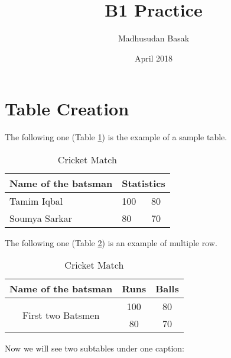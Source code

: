 \documentclass{article}
\title{B1 Practice}
\author{Madhusudan Basak}
\date{April 2018}
\begin{document}
\maketitle

\section{Table Creation}
The following one (Table \ref{tab:1}) is the example of a sample table.
\begin{table}[h!]
\centering
    \begin{tabular}{||m{2cm}| m{2cm}| m{2cm}||}
    \hline
    Name of the batsman & \multicolumn{2}{c|}{Statistics} \\
    \hline
    \hline
    Tamim Iqbal & 100 & 80 \\
    \hline
    Soumya Sarkar & 80 & 70 \\
    \hline
    \end{tabular}
    \caption{Cricket Match}
    \label{tab:1}
\end{table}


The following one (Table \ref{tab:2}) is an example of multiple row.

\begin{table}[h!]
\centering
    \begin{tabular}{|c|c|c|}
    \hline
    Name of the batsman & Runs & Balls \\
    \hline
    \multirow{2}{*}{First two Batsmen} & 100 & 80 \\

    & 80 & 70 \\
    \hline
    \end{tabular}
    \caption{Cricket Match}
    \label{tab:2}
\end{table}

Now we will see two subtables under one caption:
\end{document}

